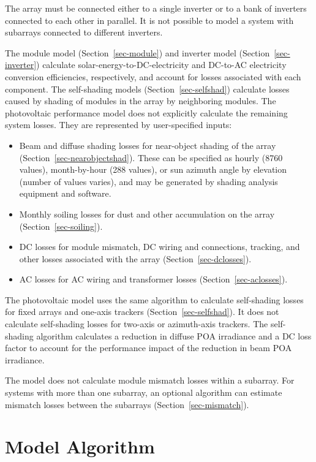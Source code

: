 \documentclass[12pt,letterpaper]{article}
\begin{document}
The array must be connected either to a single inverter or to a bank of inverters connected to each other in parallel. It is not possible to model a system with subarrays connected to different inverters.

The module model (Section~\ref{sec-module}) and inverter model (Section~\ref{sec-inverter}) calculate solar-energy-to-DC-electricity and DC-to-AC electricity conversion efficiencies, respectively, and account for losses associated with each component. The self-shading models (Section~\ref{sec-selfshad}) calculate losses caused by shading of modules in the array by neighboring modules. The photovoltaic performance model does not explicitly calculate the remaining system losses. They are represented by user-specified inputs:

\begin{itemize}
\item{Beam and diffuse shading losses for near-object shading of the array (Section~\ref{sec-nearobjectshad}). These can be specified as hourly (8760 values), month-by-hour (288 values), or sun azimuth angle by elevation (number of values varies), and may be generated by shading analysis equipment and software.}
\item{Monthly soiling losses for dust and other accumulation on the array (Section~\ref{sec-soiling}).}
\item{DC losses for module mismatch, DC wiring and connections, tracking, and other losses associated with the array (Section~\ref{sec-dclosses}).}
\item{AC losses for AC wiring and transformer losses (Section~\ref{sec-aclosses}).}
\end{itemize}

The photovoltaic model uses the same algorithm to calculate self-shading losses for fixed arrays and one-axis trackers (Section~\ref{sec-selfshad}). It does not calculate self-shading losses for two-axis or azimuth-axis trackers. The self-shading algorithm calculates a reduction in diffuse POA irradiance and a DC loss factor to account for the performance impact of the reduction in beam POA irradiance.

The model does not calculate module mismatch losses within a subarray. For systems with more than one subarray, an optional algorithm can estimate mismatch losses between the subarrays (Section~\ref{sec-mismatch}).

\section{Model Algorithm}
\end{document}
